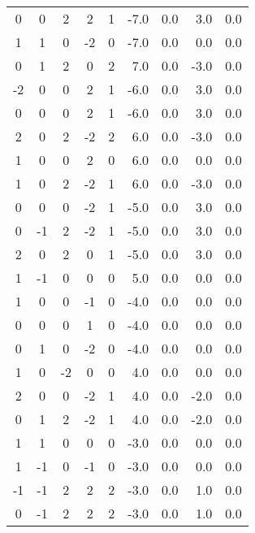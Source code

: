 \begin{center}
{\begin{xtabular}{|ccccc|rr|rr|}
  0 &  0 &  2 &  2 &  1 &      -7.0  &      0.0  &      3.0   &     0.0     \\
  1 &  1 &  0 & -2 &  0 &      -7.0  &      0.0  &      0.0   &     0.0     \\
  0 &  1 &  2 &  0 &  2 &       7.0  &      0.0  &     -3.0   &     0.0     \\
 -2 &  0 &  0 &  2 &  1 &      -6.0  &      0.0  &      3.0   &     0.0     \\
  0 &  0 &  0 &  2 &  1 &      -6.0  &      0.0  &      3.0   &     0.0     \\
  2 &  0 &  2 & -2 &  2 &       6.0  &      0.0  &     -3.0   &     0.0     \\
  1 &  0 &  0 &  2 &  0 &       6.0  &      0.0  &      0.0   &     0.0     \\
  1 &  0 &  2 & -2 &  1 &       6.0  &      0.0  &     -3.0   &     0.0     \\
  0 &  0 &  0 & -2 &  1 &      -5.0  &      0.0  &      3.0   &     0.0     \\
  0 & -1 &  2 & -2 &  1 &      -5.0  &      0.0  &      3.0   &     0.0     \\
  2 &  0 &  2 &  0 &  1 &      -5.0  &      0.0  &      3.0   &     0.0     \\
  1 & -1 &  0 &  0 &  0 &       5.0  &      0.0  &      0.0   &     0.0     \\
  1 &  0 &  0 & -1 &  0 &      -4.0  &      0.0  &      0.0   &     0.0     \\
  0 &  0 &  0 &  1 &  0 &      -4.0  &      0.0  &      0.0   &     0.0     \\
  0 &  1 &  0 & -2 &  0 &      -4.0  &      0.0  &      0.0   &     0.0     \\
  1 &  0 & -2 &  0 &  0 &       4.0  &      0.0  &      0.0   &     0.0     \\
  2 &  0 &  0 & -2 &  1 &       4.0  &      0.0  &     -2.0   &     0.0     \\
  0 &  1 &  2 & -2 &  1 &       4.0  &      0.0  &     -2.0   &     0.0     \\
  1 &  1 &  0 &  0 &  0 &      -3.0  &      0.0  &      0.0   &     0.0     \\
  1 & -1 &  0 & -1 &  0 &      -3.0  &      0.0  &      0.0   &     0.0     \\
 -1 & -1 &  2 &  2 &  2 &      -3.0  &      0.0  &      1.0   &     0.0     \\
  0 & -1 &  2 &  2 &  2 &      -3.0  &      0.0  &      1.0   &     0.0     \\

\end{xtabular}}
\end{center}
